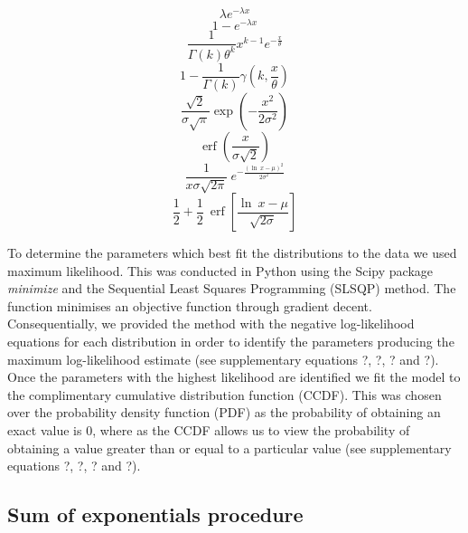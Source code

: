 \documentclass[11pt,usenames,dvipsnames]{article}
\DeclareMathOperator\erf{erf}
\begin{document}
\begin{equation}
\lambda e^{-\lambda x}
\end{equation}
\begin{equation}
1 - e^{-\lambda x}
\end{equation}
\begin{equation}
\frac{1}{\Gamma(k)\theta^k}x^{k-1}e^{-\frac{x}{\theta}}
\end{equation}
\begin{equation}
1 - \frac{1}{\Gamma(k)}\gamma(k,\frac{x}{\theta})
\end{equation}
\begin{equation}
\frac{\sqrt{2}}{\sigma \sqrt{\pi}} \exp \left(-\frac{x^2}{2 \sigma^2}\right)
\end{equation}
\begin{equation}
\erf\left(\frac{x}{\sigma \sqrt{2}}\right)
\end{equation}
\begin{equation}
\frac{1}{x \sigma \sqrt{2 \pi}}\ e^{- \frac{(\ln\ x - \mu)^2}{2\sigma^2}}
\end{equation}
\begin{equation}
\frac{1}{2} + \frac{1}{2}\ \erf\left[\frac{\ln\ x - \mu}{\sqrt{2 \sigma}}\right]
\end{equation}

To determine the parameters which best fit the distributions to the data we used maximum likelihood. This was conducted in Python using the Scipy package \textit{minimize} and the Sequential Least Squares Programming (SLSQP) method. The function minimises an objective function through gradient decent. Consequentially, we provided the method with the negative log-likelihood equations for each distribution in order to identify the parameters producing the maximum log-likelihood estimate (see supplementary equations ?, ?, ? and ?). Once the parameters with the highest likelihood are identified we fit the model to the complimentary cumulative distribution function (CCDF). This was chosen over the probability density function (PDF) as the probability of obtaining an exact value is 0, where as the CCDF allows us to view the probability of obtaining a value greater than or equal to a particular value (see supplementary equations ?, ?, ? and ?). 


\subsection{Sum of exponentials procedure}
\end{document}
